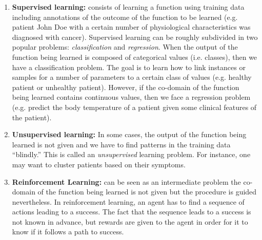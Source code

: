 \begin{enumerate}
\item \textbf{Supervised learning:} consists of learning a function using
training data including annotations of the outcome of the function to be learned
(e.g. patient John Doe with a certain number of physiological characteristics
was diagnosed with cancer). Supervised learning can be roughly subdivided in two
popular problems: \emph{classification} and \emph{regression}. When the output
of the function being learned is composed of categorical values (i.e. classes), then we have a
classification problem. The goal is to learn how to link instances or samples
for a number of parameters to a certain class of values (e.g. healthy patient or
unhealthy patient). However, if the co-domain of the function being learned
contains continuous values, then we face a regression problem (e.g. predict the 
body temperature of a patient given some clinical features of the patient).

\item \textbf{Unsupervised learning:} In some cases, the output of the function
being learned is not given and we have to find patterns in the training data
``blindly.'' This is called an \emph{unsupervised} learning problem. For
instance, one may want to cluster patients based on their symptoms.
 
\item \textbf{Reinforcement Learning:} can be seen as an intermediate
problem the co-domain of the function being learned is not given but the procedure is guided
nevertheless. In reinforcement learning, an agent has to find a sequence of
actions leading to a success. The fact that the sequence leads to a success is
not known in advance, but rewards are given to the agent in order for it to know
if it follows a path to success.


\end{enumerate}

